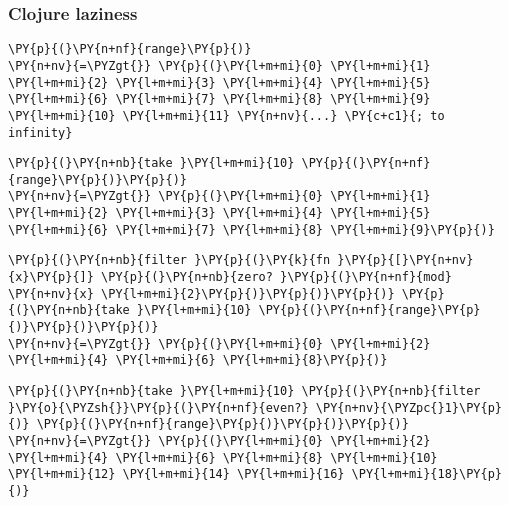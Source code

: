 \begin{frame}[fragile]
  \frametitle{Clojure laziness}
\begin{Verbatim}[commandchars=\\\{\}]
\PY{p}{(}\PY{n+nf}{range}\PY{p}{)}
\PY{n+nv}{=\PYZgt{}} \PY{p}{(}\PY{l+m+mi}{0} \PY{l+m+mi}{1} \PY{l+m+mi}{2} \PY{l+m+mi}{3} \PY{l+m+mi}{4} \PY{l+m+mi}{5} \PY{l+m+mi}{6} \PY{l+m+mi}{7} \PY{l+m+mi}{8} \PY{l+m+mi}{9} \PY{l+m+mi}{10} \PY{l+m+mi}{11} \PY{n+nv}{...} \PY{c+c1}{; to infinity}
\end{Verbatim}

  \pause

\begin{Verbatim}[commandchars=\\\{\}]
\PY{p}{(}\PY{n+nb}{take }\PY{l+m+mi}{10} \PY{p}{(}\PY{n+nf}{range}\PY{p}{)}\PY{p}{)}
\PY{n+nv}{=\PYZgt{}} \PY{p}{(}\PY{l+m+mi}{0} \PY{l+m+mi}{1} \PY{l+m+mi}{2} \PY{l+m+mi}{3} \PY{l+m+mi}{4} \PY{l+m+mi}{5} \PY{l+m+mi}{6} \PY{l+m+mi}{7} \PY{l+m+mi}{8} \PY{l+m+mi}{9}\PY{p}{)}
\end{Verbatim}

  \pause

\begin{Verbatim}[commandchars=\\\{\}]
\PY{p}{(}\PY{n+nb}{filter }\PY{p}{(}\PY{k}{fn }\PY{p}{[}\PY{n+nv}{x}\PY{p}{]} \PY{p}{(}\PY{n+nb}{zero? }\PY{p}{(}\PY{n+nf}{mod} \PY{n+nv}{x} \PY{l+m+mi}{2}\PY{p}{)}\PY{p}{)}\PY{p}{)} \PY{p}{(}\PY{n+nb}{take }\PY{l+m+mi}{10} \PY{p}{(}\PY{n+nf}{range}\PY{p}{)}\PY{p}{)}\PY{p}{)}
\PY{n+nv}{=\PYZgt{}} \PY{p}{(}\PY{l+m+mi}{0} \PY{l+m+mi}{2} \PY{l+m+mi}{4} \PY{l+m+mi}{6} \PY{l+m+mi}{8}\PY{p}{)}
\end{Verbatim}

  \pause

\begin{Verbatim}[commandchars=\\\{\}]
\PY{p}{(}\PY{n+nb}{take }\PY{l+m+mi}{10} \PY{p}{(}\PY{n+nb}{filter }\PY{o}{\PYZsh{}}\PY{p}{(}\PY{n+nf}{even?} \PY{n+nv}{\PYZpc{}1}\PY{p}{)} \PY{p}{(}\PY{n+nf}{range}\PY{p}{)}\PY{p}{)}\PY{p}{)}
\PY{n+nv}{=\PYZgt{}} \PY{p}{(}\PY{l+m+mi}{0} \PY{l+m+mi}{2} \PY{l+m+mi}{4} \PY{l+m+mi}{6} \PY{l+m+mi}{8} \PY{l+m+mi}{10} \PY{l+m+mi}{12} \PY{l+m+mi}{14} \PY{l+m+mi}{16} \PY{l+m+mi}{18}\PY{p}{)}
\end{Verbatim}
\end{frame}